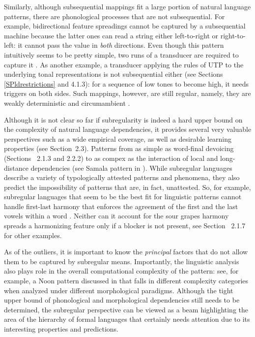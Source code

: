 Similarly, although subsequential mappings fit a large portion of natural language patterns, there are phonological processes that are not subsequential.
For example, bidirectional feature spreadings cannot be captured by a subsequential machine because the latter ones can read a string either left-to-right or right-to-left: it cannot pass the value in \emph{both} directions.
Even though this pattern intuitively seems to be pretty simple, two runs of a transducer are required to capture it \citep{Heinz-Lai-2013-VHS}.
As another example, a transducer applying the rules of UTP to the underlying tonal representations is not subsequential either (see Sections \ref{SPldrestrictions} and 4.1.3): for a sequence of low tones to become high, it needs triggers on both sides.
Such mappings, however, are still regular, namely, they are weakly deterministic and circumambient \citep{Heinz-Lai-2013-VHS,Jardine2016,LamontEtAl2019}.



Although it is not clear so far if subregularity is indeed a hard upper bound on the complexity of natural language dependencies, it provides several very valuable perspectives such as a wide empirical coverage, as well as desirable learning properties (see Section~2.3).
Patterns from as simple as word-final devoicing (Sections~ 2.1.3 and 2.2.2) to as compex as the interaction of local and long-distance dependencies (see Samala pattern in \cite{DeSantoGraf19FG}).
While subregular languages describe a variety of typologically attested patterns and phenomena, they also predict the impossibility of patterns that are, in fact, unattested.
So, for example, subregular languages that seem to be the best fit for linguistic patterns cannot handle first-last harmony that enforces the agreement of the first and the last vowels within a word \citep{Heinz-Lai-2013-VHS}.
Neither can it account for the sour grapes harmony spreads a harmonizing feature only if a blocker is not present, see Section~ 2.1.7 for other examples.


As of the outliers, it is important to know the \emph{principal} factors that do not allow them to be captured by subregular means.
Importantly, the linguistic analysis also plays role in the overall computational complexity of the pattern: see, for example, a Noon pattern discussed in \cite{MoradiAksenovaGraf2019} that falls in different complexity categories when analyzed under different morphological paradigms.
Although the tight upper bound of phonological and morphological dependencies still needs to be determined, the subregular perspective can be viewed as a beam highlighting the area of the hierarchy of formal languages that certainly needs attention due to its interesting properties and predictions.


